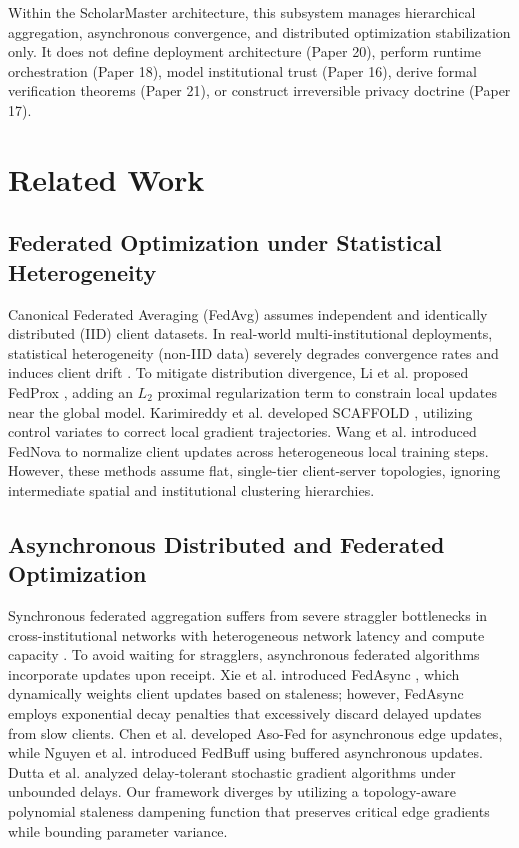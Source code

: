 \documentclass[conference]{IEEEtran}
\begin{document}
Within the ScholarMaster architecture, this subsystem manages hierarchical aggregation, asynchronous convergence, and distributed optimization stabilization only. It does not define deployment architecture (Paper 20), perform runtime orchestration (Paper 18), model institutional trust (Paper 16), derive formal verification theorems (Paper 21), or construct irreversible privacy doctrine (Paper 17).

\section{Related Work}

\subsection{Federated Optimization under Statistical Heterogeneity}
Canonical Federated Averaging (FedAvg) \cite{b1} assumes independent and identically distributed (IID) client datasets. In real-world multi-institutional deployments, statistical heterogeneity (non-IID data) severely degrades convergence rates and induces client drift \cite{b5, b7}. To mitigate distribution divergence, Li et al. proposed FedProx \cite{b15}, adding an $L_2$ proximal regularization term to constrain local updates near the global model. Karimireddy et al. developed SCAFFOLD \cite{b16}, utilizing control variates to correct local gradient trajectories. Wang et al. introduced FedNova \cite{b33} to normalize client updates across heterogeneous local training steps. However, these methods assume flat, single-tier client-server topologies, ignoring intermediate spatial and institutional clustering hierarchies.

\subsection{Asynchronous Distributed and Federated Optimization}
Synchronous federated aggregation suffers from severe straggler bottlenecks in cross-institutional networks with heterogeneous network latency and compute capacity \cite{b17, b26}. To avoid waiting for stragglers, asynchronous federated algorithms incorporate updates upon receipt. Xie et al. introduced FedAsync \cite{b4}, which dynamically weights client updates based on staleness; however, FedAsync employs exponential decay penalties that excessively discard delayed updates from slow clients. Chen et al. developed Aso-Fed \cite{b35} for asynchronous edge updates, while Nguyen et al. introduced FedBuff \cite{b36} using buffered asynchronous updates. Dutta et al. \cite{b37} analyzed delay-tolerant stochastic gradient algorithms under unbounded delays. Our framework diverges by utilizing a topology-aware polynomial staleness dampening function that preserves critical edge gradients while bounding parameter variance.
\end{document}
